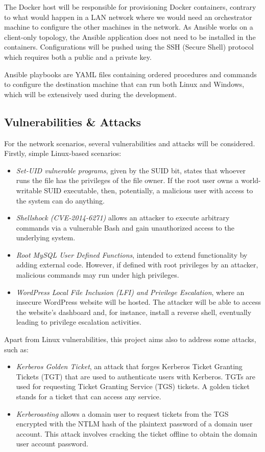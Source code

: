 The Docker host will be responsible for provisioning Docker containers, contrary to what would happen in a LAN network where we would need an orchestrator machine to configure the other machines in the network. As Ansible works on a client-only topology, the Ansible application does not need to be installed in the containers. Configurations will be pushed using the SSH (Secure Shell) protocol which requires both a public and a private key. 

Ansible playbooks are YAML files containing ordered procedures and commands to configure the destination machine that can run both Linux and Windows, which will be extensively used during the development.

\subsection{Vulnerabilities \& Attacks} \label{sec:solution_vulnerabilities_attacks}

For the network scenarios, several vulnerabilities and attacks will be considered. Firstly, simple Linux-based scenarios:

\begin{itemize}
    \item \textit{Set-UID vulnerable programs}, given by the SUID bit, states that whoever runs the file has the privileges of the file owner. If the root user owns a world-writable SUID executable, then, potentially, a malicious user with access to the system can do anything.
    \item \textit{Shellshock (CVE-2014-6271)} allows an attacker to execute arbitrary commands via a vulnerable Bash and gain unauthorized access to the underlying system.
    \item \textit{Root MySQL User Defined Functions}, intended to extend functionality by adding external code. However, if defined with root privileges by an attacker, malicious commands may run under high privileges.
    \item \textit{WordPress Local File Inclusion (LFI) and Privilege Escalation}, where an insecure WordPress website will be hosted. The attacker will be able to access the website's dashboard and, for instance, install a reverse shell, eventually leading to privilege escalation activities.
\end{itemize}

Apart from Linux vulnerabilities, this project aims also to address some attacks, such as:

\begin{itemize}
    \item \textit{Kerberos Golden Ticket}, an attack that forges Kerberos Ticket Granting Tickets (TGT) that are used to authenticate users with Kerberos. TGTs are used for requesting Ticket Granting Service (TGS) tickets. A golden ticket stands for a ticket that can access any service.
    \item \textit{Kerberoasting} allows a domain user to request tickets from the TGS encrypted with the NTLM hash of the plaintext password of a domain user account. This attack involves cracking the ticket offline to obtain the domain user account password.
\end{itemize}

